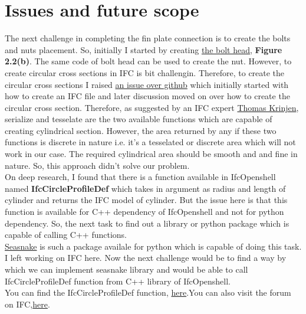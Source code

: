 \section{Issues and future scope}
The next challenge in completing the fin plate connection is to create the bolts and nuts placement. So, initially I started by creating \href{https://github.com/chavan-vjti/IfcOpenShell/blob/master/Nut.py}{the bolt head}, \textbf{Figure 2.2(b)}. The same code of bolt head can be used to create the nut. However, to create circular cross sections in IFC is bit challengin. Therefore, to create the circular cross sections I raised \href{https://github.com/IfcOpenShell/IfcOpenShell/issues/300}{an issue over github} which initially started with how to create an IFC file and later discussion moved on over how to create the circular cross section.
Therefore, as suggested by an IFC expert \href{https://github.com/aothms}{Thomas Krinjen}, serialize and tesselate are the two available functions which are capable of creating cylindrical section. However, the area returned by any if these two functions is discrete in nature i.e. it's a tesselated or discrete area which will not work in our case. The required cylindrical area should be smooth and and fine in nature. So, this approach didn't solve our problem.\\
On deep research, I found that there is a function available in IfcOpenshell named \textbf{IfcCircleProfileDef} which takes in argument as radius and length of cylinder and returns the IFC model of cylinder. But the issue here is that this function is available for C++ dependency of IfcOpenshell and not for python dependency. So, the next task to find out a library or python package which is capable of calling C++ functions.\\
\href{https://pypi.python.org/pypi/seasnake/0.0.0}{Seasnake} is such a package availale for python which is capable of doing this task. I left working on IFC here. Now the next challenge would be to find a way by which we can implement seasnake library and would be able to call IfcCircleProfileDef function from C++ library of IfcOpenshell.\\
You can find the IfcCircleProfileDef function, \href{https://github.com/IfcOpenShell/IfcOpenShell/blob/master/src/examples/profiles.cpp}{here}.You can also visit the forum on IFC,\href{https://sourceforge.net/p/ifcopenshell/discussion/1782717/thread/d09c83b7/?limit=25}{here}.
